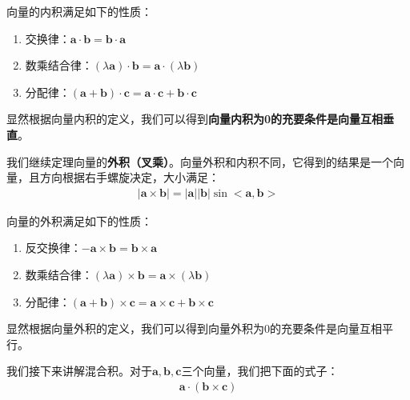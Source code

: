 \documentclass{ctexart}
\let\oldtextbf\textbf %
\renewcommand{\textbf}[1]{\textcolor{btex}{\oldtextbf{#1}}} %
\begin{document}
\begin{tcolorbox}[
    colback=bac2,     %
    colframe=fra2,   %
    coltitle=white,             %
    coltext=tex2,
    title=向量内积的性质,
    fonttitle=\bfseries,        %
arc=3mm,                     %
breakable
]
向量的内积满足如下的性质：
\begin{enumerate}
    \item 交换律：$\bm{a}\cdot\bm{b}=\bm{b}\cdot\bm{a}$
    \item 数乘结合律：$(\lambda\bm{a})\cdot\bm{b}=\bm{a}\cdot(\lambda\bm{b})$
    \item 分配律：$(\bm{a}+\bm{b})\cdot\bm{c}=\bm{a}\cdot\bm{c}+\bm{b}\cdot\bm{c}$
\end{enumerate}
\end{tcolorbox}

显然根据向量内积的定义，我们可以得到\textbf{向量内积为0的充要条件是向量互相垂直}。

我们继续定理向量的\textbf{外积（叉乘）}。向量外积和内积不同，它得到的结果是一个向量，且方向根据右手螺旋决定，大小满足：
\begin{align*}
|\bm{a}\times\bm{b}|=|\bm{a}||\bm{b}|\sin<\bm{a},\bm{b}>\tag{6-2}
\end{align*}

\begin{tcolorbox}[
    colback=bac2,     %
    colframe=fra2,   %
    coltitle=white,             %
    coltext=tex2,
    title=向量外积的性质,
    fonttitle=\bfseries,        %
arc=3mm,                     %
breakable
]
向量的外积满足如下的性质：
\begin{enumerate}
    \item 反交换律：$-\bm{a}\times\bm{b}=\bm{b}\times\bm{a}$
    \item 数乘结合律：$(\lambda\bm{a})\times\bm{b}=\bm{a}\times(\lambda\bm{b})$
    \item 分配律：$(\bm{a}+\bm{b})\times\bm{c}=\bm{a}\times\bm{c}+\bm{b}\times\bm{c}$
\end{enumerate}
\end{tcolorbox}

显然根据向量外积的定义，我们可以得到向量外积为0的充要条件是向量互相平行。

我们接下来讲解混合积。对于$\bm{a},\bm{b},\bm{c}$三个向量，我们把下面的式子：
\begin{align*}
    \bm{a}\cdot(\bm{b}\times\bm{c})\tag{6-3}
\end{align*}
\end{document}
